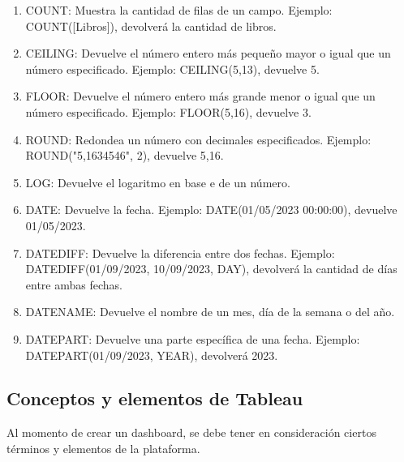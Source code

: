 \documentclass[a4paper, 12pt]{book}
\begin{document}
\begin{enumerate}
	\item COUNT: Muestra la cantidad de filas de un campo. Ejemplo: COUNT([Libros]), devolverá la cantidad de libros.
	\item CEILING: Devuelve el número entero más pequeño mayor o igual que un número especificado. Ejemplo: CEILING(5,13), devuelve 5.
	\item FLOOR: Devuelve el número entero más grande menor o igual que un número especificado. Ejemplo: FLOOR(5,16), devuelve 3.
	\item ROUND: Redondea un número con decimales especificados. Ejemplo: ROUND("5,1634546", 2), devuelve 5,16.
	\item LOG: Devuelve el logaritmo en base e de un número.
	\item DATE: Devuelve la fecha. Ejemplo: DATE(01/05/2023 00:00:00), devuelve 01/05/2023.
	\item DATEDIFF: Devuelve la diferencia entre dos fechas. Ejemplo: DATEDIFF(01/09/2023, 10/09/2023, DAY), devolverá la cantidad de días entre ambas fechas.
	\item DATENAME: Devuelve el nombre de un mes, día de la semana o del año.
	\item DATEPART: Devuelve una parte específica de una fecha. Ejemplo: DATEPART(01/09/2023, YEAR), devolverá 2023.
\end{enumerate}

\subsection{Conceptos y elementos de Tableau}
Al momento de crear un dashboard, se debe tener en consideración ciertos términos y elementos de la plataforma.
\end{document}
